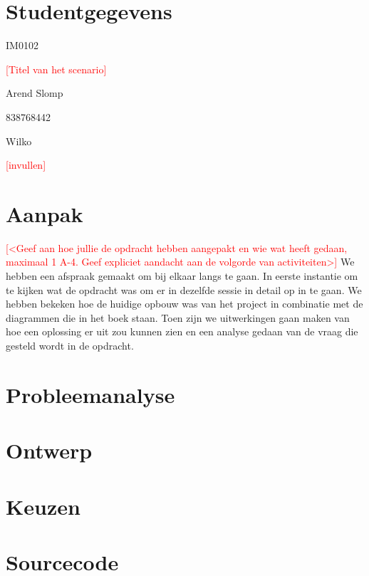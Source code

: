 \documentclass[a4paper]{article}
\newcommand{\todo}[1]{\textcolor{red}{[#1]}}
\begin{document}
\pagestyle{fancy}

\section*{Studentgegevens}
\begin{description}
	\item [Cursuscode] IM0102
	\item \todo{Titel van het scenario}
	\item [Naam] Arend Slomp
	\item [Studentnummer] 838768442
	\item [Naam] Wilko
	\item [Studentnummer] \todo{invullen}
\end{description}

\section*{Aanpak}
\todo{<Geef aan hoe jullie de opdracht hebben aangepakt en wie wat heeft gedaan, maximaal 1 A-4. Geef expliciet aandacht aan de volgorde van activiteiten>}
We hebben een afspraak gemaakt om bij elkaar langs te gaan. In eerste instantie om te kijken wat de opdracht was om er in dezelfde sessie in detail op in te gaan. We hebben bekeken hoe de huidige opbouw was van het project in combinatie met de diagrammen die in het boek staan. Toen zijn we uitwerkingen gaan maken van hoe een oplossing er uit zou kunnen zien en een analyse gedaan van de vraag die gesteld wordt in de opdracht.


\section{Probleemanalyse}


\section{Ontwerp}


\section{Keuzen}



\section{Sourcecode}
\end{document}
